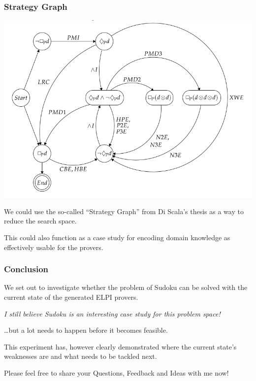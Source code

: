 \documentclass[aspectratio=169, usenames, dvipsnames]{beamer}
\newcommand{\ELPI}{\textsf{ELPI}\xspace}
\begin{document}
\begin{frame}
\frametitle{Strategy Graph}
\begin{minipage}{0.65\textwidth}
\begin{center}
\includegraphics[height=0.7\textheight, keepaspectratio]{images/strategy_graph.png} 
\end{center}
\end{minipage}\begin{minipage}{0.3\textwidth}
We could use the so-called ``Strategy Graph'' from Di Scala's thesis as a way to reduce the search space.
\bigskip

This could also function as a case study for encoding domain knowledge as effectively usable for the provers.
\end{minipage}
\end{frame}

\begin{frame}
\frametitle{Conclusion}

We set out to investigate whether the problem of Sudoku can be solved with the current state of the generated \ELPI provers.
\pause\bigskip

\begin{center}
\emph{I still believe Sudoku is an interesting case study for this problem space!}
\pause

\dots but a lot needs to happen before it becomes feasible.
\end{center}
\bigskip\pause

This experiment has, however clearly demonstrated where the current state's weaknesses are and what needs to be tackled next.
\bigskip\pause

Please feel free to share your Questions, Feedback and Ideas with me now!

\end{frame}
\end{document}
